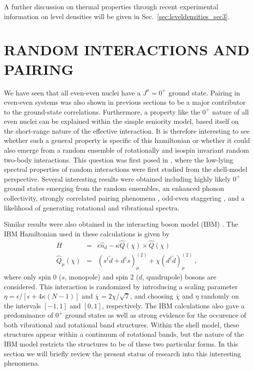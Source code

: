 \documentclass[rmp,preprint,aps,floatfix]{revtex4}
\begin{document}
A further discussion on thermal properties through recent experimental
information on level densities will be given in 
Sec.~\ref{sec:leveldensities_sec3}. 



\section{RANDOM INTERACTIONS AND PAIRING}

\label{sec:randoms}

We have seen that all even-even
nuclei have a $J^{\pi}=0^+$ ground state. Pairing in
even-even systems was also shown in previous sections 
to be a major contributor to the ground-state correlations. 
Furthermore, a property like the $0^+$ nature of all even nuclei
can be explained within the simple seniority model, based itself 
on the short-range nature of the effective interaction. It is therefore 
interesting to see whether such a general property is specific of this
hamiltonian or whether it could also 
emerge from 
a random ensemble of rotationally and isospin invariant random two-body
interactions. This question was first posed in 
\cite{jbd98}, where the low-lying spectral properties
of random interactions were first studied from the shell-model
perspective. Several interesting results were obtained including
highly likely $0^+$ ground states emerging from the random ensembles,
an enhanced phonon collectivity, strongly correlated pairing 
phenomena \cite{jbdt00}, odd-even staggering \cite{papen02},
and a likelihood of generating rotational and vibrational spectra. 

Similar results
were also obtained in the interacting
boson model (IBM) \cite{bf00}. 
The IBM Hamiltonian used in these calculations is given by 
\begin{eqnarray}
H &=& \epsilon\hat{n}_d - \kappa\hat{Q}(\chi)\times \hat{Q}(\chi) \; \\
\hat{Q}_\mu(\chi)&=&\left(s^\dagger\tilde{d}+d^\dagger s\right)_\mu^{(2)}
+\chi \left(d^\dagger \tilde{d}\right)^{(2)}_\mu \;, 
\end{eqnarray}
where only spin 0 ($s$, monopole) and spin 2 ($d$, quadrupole) 
bosons are considered. This interaction is randomized by introducing
a scaling parameter $\eta = \epsilon/\left[\epsilon + 4\kappa(N-1)\right]$
and $\bar{\chi}=2\chi/\sqrt{7}$, and choosing $\bar{\chi}$ and $\eta$ 
randomly on the intervals $[-1,1]$ and $[0,1]$, respectively. 
The IBM calculations also 
gave a predominance of $0^+$ ground states as well as 
strong evidence for the occurence of both vibrational and
rotational band structures. Within the shell model, these structures
appear within a continuum of rotational bands, but the nature of the
IBM model restricts the structures to be of these two particular
forms. In this section we will briefly review the present 
status of research into this interesting phenomena. 
\end{document}
